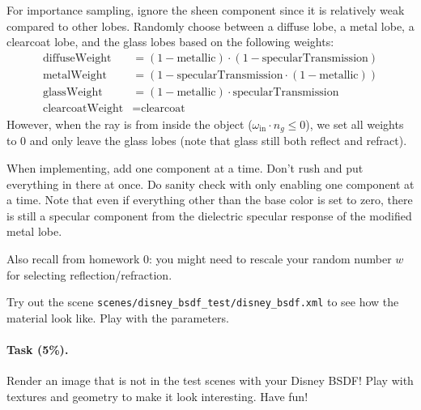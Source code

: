 For importance sampling, ignore the sheen component since it is relatively weak compared to other lobes. Randomly choose between a diffuse lobe, a metal lobe, a clearcoat lobe, and the glass lobes based on the following weights:
\begin{equation}
\begin{aligned}
\text{diffuseWeight} &= (1 - \text{metallic}) \cdot (1 - \text{specularTransmission}) \\
\text{metalWeight} &= (1 - \text{specularTransmission} \cdot (1 - \text{metallic})) \\
\text{glassWeight} &= (1 - \text{metallic}) \cdot \text{specularTransmission} \\
\text{clearcoatWeight} &= \text{clearcoat}
\end{aligned}
\end{equation}
However, when the ray is from inside the object ($\omega_{\text{in}} \cdot n_g \leq 0$), we set all weights
to $0$ and only leave the glass lobes (note that glass still both reflect and refract).

When implementing, add one component at a time. Don't rush and put everything in there at once. Do sanity check with only enabling one component at a time. Note that even if everything other than the base color is set to zero, there is still a specular component from the dielectric specular response of the modified metal lobe. 

Also recall from homework 0: you might need to rescale your random number $w$ for selecting reflection/refraction.

Try out the scene \lstinline{scenes/disney_bsdf_test/disney_bsdf.xml} to see how the material look like. Play with the parameters.

\paragraph{Task (5\%).} Render an image that is not in the test scenes with your Disney BSDF! Play with textures and geometry to make it look interesting. Have fun!




